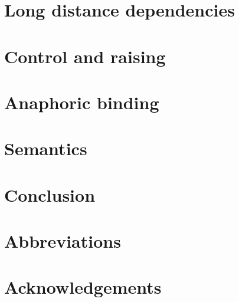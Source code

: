 \documentclass[output=paper]{langsci/langscibook}
\begin{document}
\section{Long distance dependencies}

\section{Control and raising}

\section{Anaphoric binding}

\section{Semantics}

\section{Conclusion}

 
\section*{Abbreviations}
\section*{Acknowledgements}

\printbibliography[heading=subbibliography,notkeyword=this] 
\end{document}
